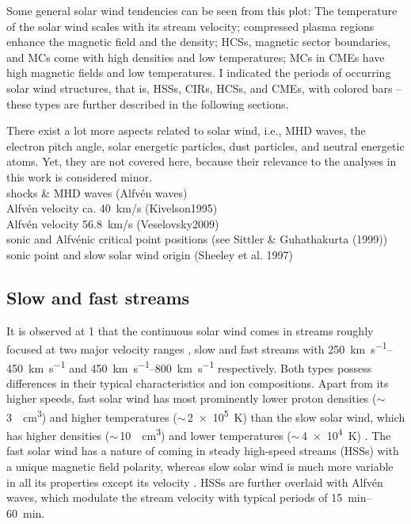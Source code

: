 Some general solar wind tendencies can be seen from this plot: The temperature of the solar wind scales with its stream velocity; compressed plasma regions enhance the magnetic field and the density; HCSs, magnetic sector boundaries, and MCs come with high densities and low temperatures; MCs in CMEs have high magnetic fields and low temperatures. I indicated the periods of occurring solar wind structures, that is, HSSs, CIRs, HCSs, and CMEs, with colored bars -- these types are further described in the following sections.

There exist a lot more aspects related to solar wind, i.e., MHD waves, the electron pitch angle, solar energetic particles, dust particles, and neutral energetic atoms. Yet, they are not covered here, because their relevance to the analyses in this work is considered minor.\\


shocks \& MHD waves (Alfvén waves)\\
Alfvén velocity ca. 40~km/s (Kivelson1995)\\
Alfvén velocity 56.8~km/s (Veselovsky2009)\\

sonic and Alfvénic critical point positions (see Sittler \& Guhathakurta (1999))\\
sonic point and slow solar wind origin (Sheeley et al. 1997)\\


\subsection{Slow and fast streams}
\label{sec:slow_and_fast_streams}
It is observed at \SI{1}{\au} that the continuous solar wind comes in streams roughly focused at two major velocity ranges \citep{Neugebauer1966,Schwenn1983}, slow and fast streams with \SIrange{250}{450}{\km\per\s} and \SIrange{450}{800}{\km\per\s} respectively. Both types possess differences in their typical characteristics and ion compositions. Apart from its higher speeds, fast solar wind has most prominently lower proton densities ($\sim$\,\SI{3}{\per\cm\cubed}) and higher temperatures ($\sim$\,\SI{2e5}{\K}) than the slow solar wind, which has higher densities ($\sim$\,\SI{10}{\per\cm\cubed}) and lower temperatures ($\sim$\,\SI{4e4}{\K}) \citep{Schwenn1990}. The fast solar wind has a nature of coming in steady high-speed streams (HSSs) with a unique magnetic field polarity, whereas slow solar wind is much more variable in all its properties except its velocity \citep{Bame1977}. HSSs are further overlaid with Alfvén waves, which modulate the stream velocity with typical periods of \SIrange{15}{60}{\minute}.

